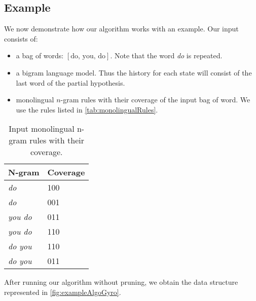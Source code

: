 \subsection{Example}

We now demonstrate how our algorithm works with an example.
Our input consists of:
%
\begin{itemize}
  \item a bag of words: $[\text{do, you, do}]$. Note that the word \emph{do} is repeated.
  \item a bigram language model. Thus the history for each state will consist of the
    last word of the partial hypothesis.
  \item monolingual $n$-gram rules with their coverage of the input bag of word. We
    use the rules listed in \autoref{tab:monolingualRules}.
\end{itemize}
%
\begin{table}
  \begin{center}
  \begin{tabular}{l|l}
    N-gram & Coverage \\
    \hline
    \emph{do} & 100 \\
    \emph{do} & 001 \\
    \emph{you do} & 011 \\
    \emph{you do} & 110 \\
    \emph{do you} & 110 \\
    \emph{do you} & 011 \\
  \end{tabular}
  \caption{Input monolingual n-gram rules with their coverage.}
  \label{tab:monolingualRules}
  \end{center}
\end{table}
%
After running our algorithm without pruning, we obtain the data structure
represented in \autoref{fig:exampleAlgoGyro}.
%
